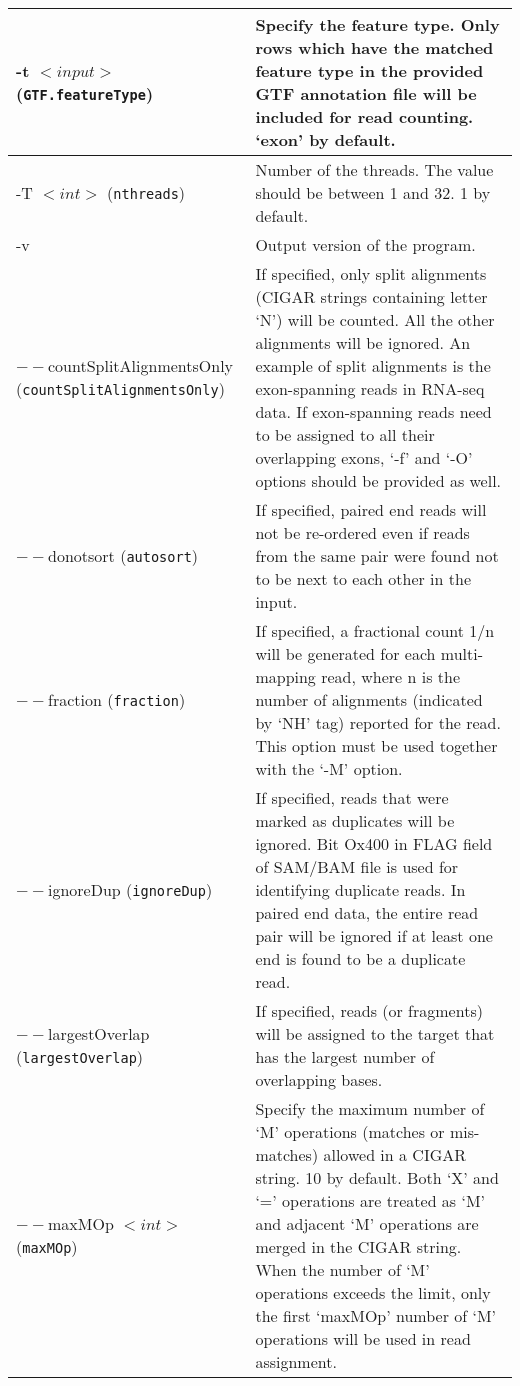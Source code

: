 \documentclass[12pt]{report}
\newcommand{\code}[1]{{\small\texttt{#1}}}
\begin{document}
\begin{longtable}{|p{5cm}|p{11cm}|}
\hline
-t $<input>$ \newline (\code{GTF.featureType}) & Specify the feature type. Only rows which have the matched feature type in the provided GTF annotation file will be included for read counting. `exon' by default.\\
\hline
-T $<int>$ \newline (\code{nthreads}) & Number of the threads. The value should be between 1 and 32. 1 by default.\\
\hline
-v & Output version of the program. \\
\hline
$--$countSplitAlignmentsOnly \newline (\code{countSplitAlignmentsOnly}) & If specified, only split alignments (CIGAR strings containing letter `N') will be counted. All the other alignments will be ignored. An example of split alignments is the exon-spanning reads in RNA-seq data. If exon-spanning reads need to be assigned to all their overlapping exons, `-f' and `-O' options should be provided as well.\\
\hline
$--$donotsort \newline (\code{autosort}) & If specified, paired end reads will not be re-ordered even if reads from the same pair were found not to be next to each other in the input.\\
\hline
$--$fraction \newline (\code{fraction}) & If specified, a fractional count 1/n will be generated for each multi-mapping read, where n is the number of alignments (indicated by `NH' tag) reported for the read. This option must be used together with the `-M' option.\\
\hline
$--$ignoreDup \newline (\code{ignoreDup}) & If specified, reads that were marked as duplicates will be ignored. Bit Ox400 in FLAG field of SAM/BAM file is used for identifying duplicate reads. In paired end data, the entire read pair will be ignored if at least one end is found to be a duplicate read.\\
\hline
$--$largestOverlap \newline (\code{largestOverlap}) & If specified, reads (or fragments) will be assigned to the target that has the largest number of overlapping bases.\\
\hline
$--$maxMOp $<int>$ \newline (\code{maxMOp}) & Specify the maximum number of `M' operations (matches or mis-matches) allowed in a CIGAR string. 10 by default. Both `X' and `=' operations are treated as `M' and adjacent `M' operations are merged in the CIGAR string. When the number of `M' operations exceeds the limit, only the first `maxMOp' number of `M' operations will be used in read assignment.\\

\end{longtable}
\end{document}
